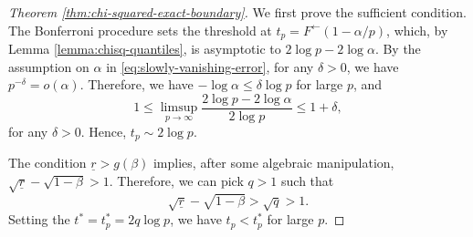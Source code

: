 \begin{proof}[Theorem \ref{thm:chi-squared-exact-boundary}]
We first prove the sufficient condition.
The Bonferroni procedure sets the threshold at $t_p = F^\leftarrow(1-\alpha/p)$, which, by Lemma \ref{lemma:chisq-quantiles}, is asymptotic to $2\log{p} - 2\log{\alpha}$.
By the assumption on $\alpha$ in \eqref{eq:slowly-vanishing-error}, for any $\delta>0$, we have $p^{-\delta}=o(\alpha)$.
Therefore, we have $-\log\alpha\le\delta\log{p}$ for large $p$, and
\begin{equation*} 
    1 \le \limsup_{p\to\infty}\frac{2\log{p} - 2\log{\alpha}}{2\log{p}} \le 1+\delta,
\end{equation*}
for any $\delta>0$.
Hence, $t_p\sim 2\log{p}$.

The condition $\underline{r} > {{g}}(\beta)$ implies, after some algebraic manipulation,
$\sqrt{\underline{r}} -\sqrt{1-\beta} > 1$.
Therefore, we can pick $q>1$ such that 
\begin{equation} \label{eq:choice-of-q}
    \sqrt{\underline{r}} -\sqrt{1-\beta} > \sqrt{q} > 1.
\end{equation}
Setting the $t^* = t^*_p = 2q\log{p}$, we have $t_p < t^*_p$ for large $p$.


\end{proof}
